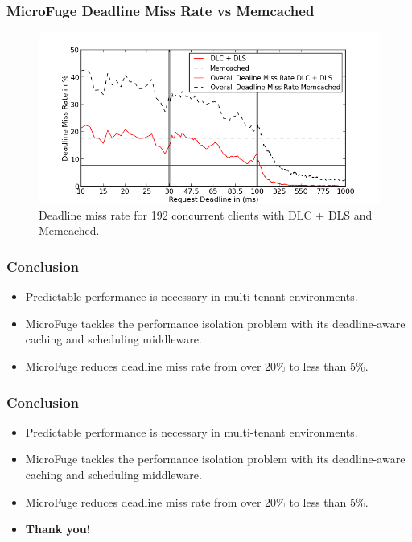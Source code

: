 \documentclass{beamer}
\newcommand{\myv}{\vspace{3 mm}}
\begin{document}
\begin{frame}
  \frametitle{MicroFuge Deadline Miss Rate vs Memcached}
  \begin{figure}[t]
    \begin{center}
      \centerline{\includegraphics[scale=0.5]{img/EC2/EC2_SH_MM/miss_48.png}}
      \caption{Deadline miss rate for 192 concurrent clients with DLC + DLS and Memcached.}
      \label{fig:miss_192_sh_mm}
    \end{center}
  \end{figure}
\end{frame}


\begin{frame}
  \frametitle{Conclusion}
  \begin{itemize}
  \item Predictable performance is necessary in multi-tenant environments.
    \myv
  \item MicroFuge tackles the performance isolation problem with its
    deadline-aware caching and scheduling middleware.
    \myv
  \item MicroFuge reduces deadline miss rate from over 20\% to
    less than 5\%.
  \end{itemize}
\end{frame}


\begin{frame}
  \frametitle{Conclusion}
  \begin{itemize}
  \item Predictable performance is necessary in multi-tenant environments.
    \myv
  \item MicroFuge tackles the performance isolation problem with its
    deadline-aware caching and scheduling middleware.
    \myv
  \item MicroFuge reduces deadline miss rate from over 20\% to
    less than 5\%.
    \myv
  \item \textbf{Thank you!}
  \end{itemize}
\end{frame}
\end{document}

